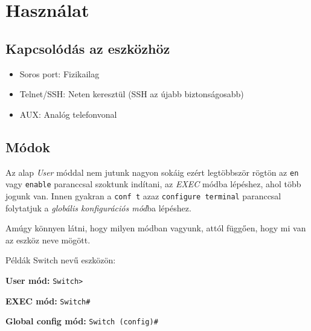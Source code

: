 \chapter{Használat}
\section{Kapcsolódás az eszközhöz}
\begin{itemize}
\item{Soros port: Fizikailag}
\item{Telnet/SSH: Neten keresztül (SSH az újabb biztonságosabb)}
\item{AUX: Analóg telefonvonal}
\end{itemize}
\section{Módok}
Az alap \emph{User} móddal nem jutunk nagyon sokáig ezért legtöbbször rögtön az
\verb|en| vagy \verb|enable| paranccsal szoktunk indítani, az \emph{EXEC} módba lépéshez, ahol több jogunk van.
Innen gyakran a \verb|conf t| azaz \verb|configure terminal| paranccsal folytatjuk a \emph{globális konfigurációs mód}ba lépéshez.

\begin{info}[Kinézet]
Amúgy könnyen látni, hogy milyen módban vagyunk, attól függően, hogy mi van az eszköz neve mögött. 


Példák Switch nevű eszközön:

\textbf{User mód:} \verb|Switch>|

\textbf{EXEC mód:} \verb|Switch#|

\textbf{Global config mód:} \verb|Switch (config)#|

\end{info}
